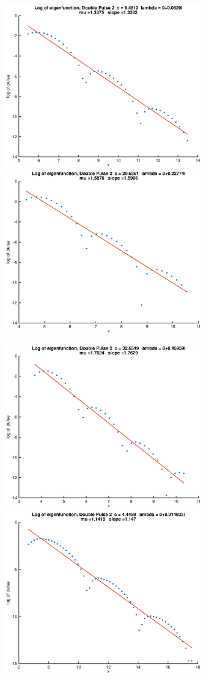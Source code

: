 \documentclass[12pt]{article}
\begin{document}
\begin{figure}[H]
\includegraphics[width=8.5cm]{decay1.eps}
\includegraphics[width=8.5cm]{decay2.eps}
\end{figure}

\begin{figure}[H]
\includegraphics[width=8.5cm]{decay3.eps}
\includegraphics[width=8.5cm]{decay4.eps}
\end{figure}
\end{document}
